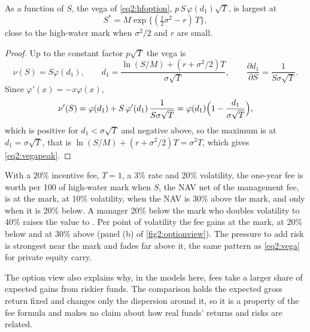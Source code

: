 \begin{chapterrefs}
\begin{proposition}\label{prop2:vegapeak}
As a function of $S$, the vega of \cref{eq2:hfoption}, $p\,S\,\varphi(d_1)\sqrt{T}$, is largest at
\begin{equation}\label{eq2:vegapeak}
  S^{*} = M\exp\bigl\{(\tfrac12\sigma^2 - r)\,T\bigr\},
\end{equation}
close to the high-water mark when $\sigma^2/2$ and $r$ are small.
\end{proposition}
\begin{proof}
Up to the constant factor $p\sqrt T$ the vega is
\begin{equation*}
  \nu(S) = S\varphi(d_1), \qquad d_1 = \frac{\ln(S/M) + (r+\sigma^2/2)T}{\sigma\sqrt T},
  \qquad \frac{\partial d_1}{\partial S} = \frac{1}{S\sigma\sqrt T}.
\end{equation*} Since $\varphi'(x) = -x\varphi(x)$,
\begin{equation*}
  \nu'(S) = \varphi(d_1) + S\,\varphi'(d_1)\,\frac{1}{S\sigma\sqrt T}
          = \varphi(d_1)\Bigl(1 - \frac{d_1}{\sigma\sqrt T}\Bigr),
\end{equation*}
which is positive for $d_1 < \sigma\sqrt T$ and negative above, so the maximum is at $d_1 = \sigma\sqrt T$,
that is $\ln(S/M) + (r + \sigma^2/2)T = \sigma^2 T$, which gives \cref{eq2:vegapeak}.
\end{proof}

With a 20\% incentive fee, $T=1$, a 3\% rate and 20\% volatility, the one-year fee is worth \optAtSigTwenty{} per 100 of high-water mark when $S$, the NAV net of the management fee, is at the mark,
\optAtSigTen{} at 10\% volatility, \optUpSigTwenty{} when the NAV is 30\% above the mark, and only
\optDownSigTwenty{} when it is 20\% below. A manager 20\% below the mark who doubles volatility to 40\%
raises the value to \optDownSigForty. Per point of volatility the fee gains \optVegaAt{} at the mark,
\optVegaDown{} at 20\% below and \optVegaUp{} at 30\% above (panel (b) of \cref{fig2:optionview}). The
pressure to add risk is strongest near the mark and fades far above it, the same pattern as
\cref{eq2:vega} for private equity carry.

The option view also explains why, in the models here, fees take a larger share of expected gains from
riskier funds. The comparison holds the expected gross return fixed and changes only the dispersion
around it, so it is a property of the fee formula and makes no claim about how real funds' returns
and risks are related.


\end{chapterrefs}
